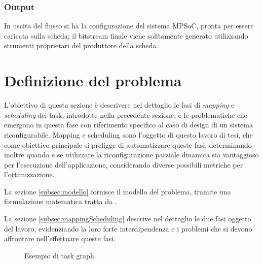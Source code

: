 \subsubsection{Output}
In uscita del flusso si ha la configurazione del sistema MPSoC, pronta per essere caricata sulla scheda;
il bitstream finale viene solitamente generato utilizzando strumenti proprietari del produttore della scheda.



\section{Definizione del problema}
\label{sec:definizioneProblema}
L'obiettivo di questa sezione \`e descrivere nel dettaglio le fasi di \emph{mapping} e \emph{scheduling}
dei task, introdotte nella precedente sezione, e le problematiche che emergono in questa fase con riferimento
specifico al caso di design di un sistema riconfigurabile.
Mapping e scheduling sono l'oggetto di questo lavoro di tesi, che come obiettivo principale si prefigge di
automatizzare queste fasi, determinando inoltre quando e se utilizzare la riconfigurazione parziale dinamica
sia vantaggioso per l'esecuzione dell'applicazione, considerando diverse possibili metriche per l'ottimizzazione.

La sezione \ref{subsec:modello} fornisce il modello del problema, tramite una formulazione matematica tratta
da \cite{ModelloRedaelli,ReconfigurableSystemDesignVerification}.

La sezione \ref{subsec:mappingScheduling} descrive nel dettaglio le due fasi oggetto del lavoro, evidenziando
la loro forte interdipendenza e i problemi che si devono affrontare nell'effettuare queste fasi.

\begin{figure}[ht]
\begin{center}
\caption{Esempio di task graph.}
\label{fig:taskGraphExample}
\end{center}
\end{figure}

